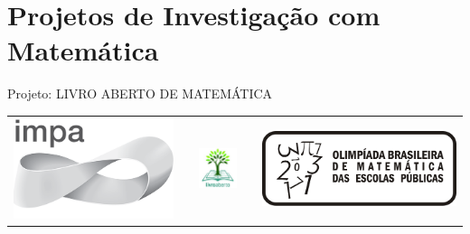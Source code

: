 \ifnum{}
\renewcommand\chapterillustration{./abertura-investigacao}
\else
\renewcommand\chapterillustration{./abertura-investigacao-professor}
\fi

\def\chapterwhat{Taxas, índices e indicadores sociais, econômicos e ambientais. Compreensão de aspectos teóricos e práticos dessas informações, com uma metodologia que busca a análise de situações reais, tanto locais quanto globais.}

\def\chapterbecause{Na era da informação, somos inundados por dados sobre os mais diversos fenômenos da realidade. Compreender a obtenção e organização desses dados torna-se importante para planejarmos ações que busquem uma organização social mais justa e sustentável.} 
\chapter{Projetos de Investigação com Matemática}
\label{ladri-chap}

\mbox{}\thispagestyle{empty}\clearpage

\thispagestyle{empty}

\begin{center}
Projeto: LIVRO ABERTO DE MATEMÁTICA

\noindent \begin{tabular}{lcccr}
\includegraphics[scale=.15]{impa}& \quad\quad& \includegraphics[width=3cm]{logo} & \quad\quad& \includegraphics[scale=.24]{obmep} 
\end{tabular}
\end{center}

